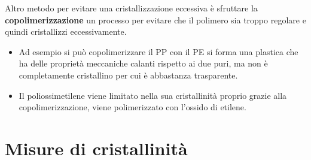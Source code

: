 Altro metodo per evitare una cristallizzazione eccessiva è sfruttare la \textbf{copolimerizzazione} un processo per evitare che il polimero sia troppo regolare e quindi cristallizzi eccessivamente.
\begin{itemize}
\item Ad esempio si può copolimerizzare il \ac{PP} con il \ac{PE} si forma una plastica che ha delle proprietà meccaniche calanti rispetto ai due puri, ma non è completamente cristallino per cui è abbastanza trasparente.
\item Il poliossimetilene viene limitato nella sua cristallinità proprio grazie alla copolimerizzazione, viene polimerizzato con l'ossido di etilene. 
\end{itemize}

\section{Misure di cristallinità}